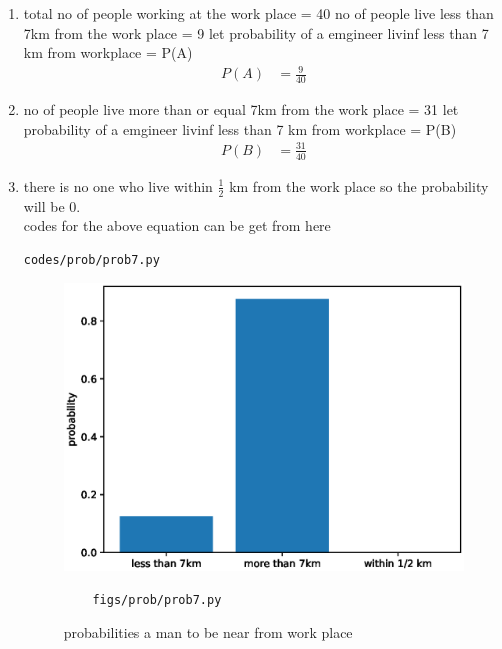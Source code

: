 \renewcommand{\theequation}{\theenumi}
\begin{enumerate}[label=\arabic*.,ref=\thesubsection.\theenumi]
\item total no of people working at the work place = 40
no of people live less than 7km from the work place = 9
let probability of a emgineer livinf less than 7 km from workplace = P(A)
\begin{align}
P\left(A\right)&=\frac{9}{40}
\end{align}
\item no of people live more  than or equal 7km from the work place = 31
let probability of a emgineer livinf less than 7 km from workplace = P(B)
\begin{align}
P\left(B\right)&=\frac{31}{40}
\end{align}
\item there is no one who live within $\frac{1}{2}$ km from the work place so the probability will be 0.
\\
codes for the above equation can be get from here
\begin{lstlisting}
codes/prob/prob7.py
\end{lstlisting}
\begin{figure}[!ht]
	\centering
	\includegraphics[width=\columnwidth]{./figures/prob/prob7.eps}
	\caption{probabilities a man to be near from work place}
	\label{fig:bt7}
	\begin{lstlisting}
	figs/prob/prob7.py
	\end{lstlisting}
\end{figure}
\end{enumerate}